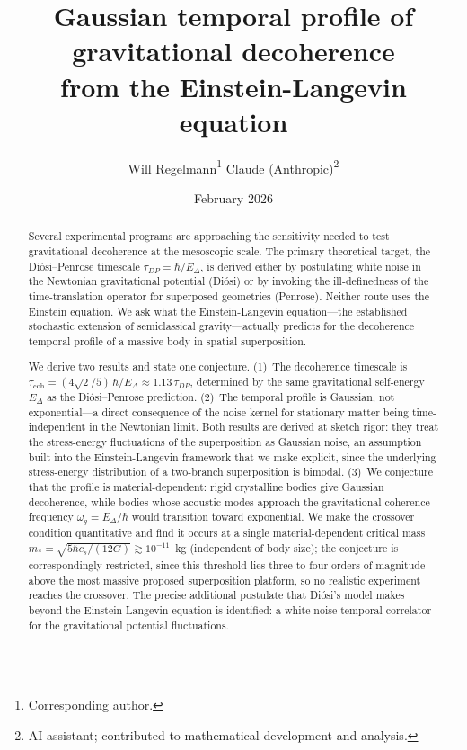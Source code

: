 \documentclass[12pt,a4paper]{article}
\title{\textbf{Gaussian temporal profile of gravitational decoherence\\[6pt]
from the Einstein-Langevin equation}}
\author{Will Regelmann\thanks{Corresponding author.} \quad Claude (Anthropic)\thanks{AI
assistant; contributed to mathematical development and analysis.}}
\date{February 2026}
\theoremstyle{remark}
\begin{document}
\maketitle

\begin{abstract}
Several experimental programs are approaching the sensitivity needed to test gravitational
decoherence at the mesoscopic scale. The primary theoretical target, the
Di\'osi--Penrose timescale $\tau_{DP} = \hbar/E_\Delta$, is derived either by postulating
white noise in the Newtonian gravitational potential (Di\'osi) or by invoking the
ill-definedness of the time-translation operator for superposed geometries (Penrose).
Neither route uses the Einstein equation. We ask what the Einstein-Langevin
equation---the established stochastic extension of semiclassical gravity---actually
predicts for the decoherence temporal profile of a massive body in spatial superposition.

We derive two results and state one conjecture. (1)~The decoherence timescale is
$\tau_{\text{coh}} = (4\sqrt{2}/5)\,\hbar/E_\Delta \approx 1.13\,\tau_{DP}$, determined by
the same gravitational self-energy $E_\Delta$ as the Di\'osi--Penrose prediction. (2)~The
temporal profile is Gaussian, not exponential---a direct consequence of the noise kernel
for stationary matter being time-independent in the Newtonian limit. Both results are
derived at sketch rigor: they treat the stress-energy fluctuations of the superposition as
Gaussian noise, an assumption built into the Einstein-Langevin framework that we make
explicit, since the underlying stress-energy distribution of a two-branch superposition is
bimodal. (3)~We conjecture that the profile is material-dependent: rigid crystalline
bodies give Gaussian decoherence, while bodies whose acoustic modes approach the
gravitational coherence frequency $\omega_g = E_\Delta/\hbar$ would transition toward
exponential. We make the crossover condition quantitative and find it occurs at a single
material-dependent critical mass $m_\ast=\sqrt{5\hbar c_s/(12G)}\gtrsim10^{-11}$~kg
(independent of body size); the conjecture is correspondingly restricted, since this
threshold lies three to four orders of magnitude above the most massive proposed
superposition platform, so no realistic experiment reaches the crossover. The precise
additional postulate that Di\'osi's model makes beyond the
Einstein-Langevin equation is identified: a white-noise temporal correlator for the
gravitational potential fluctuations.
\end{abstract}
\end{document}
